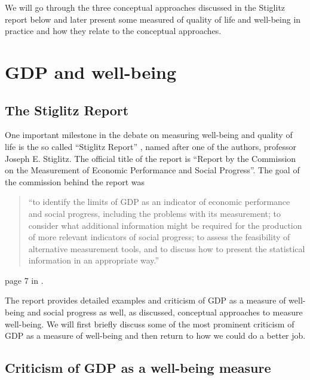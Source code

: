 \documentclass[]{book}
\begin{document}
\citep[page 41 in][]{stiglitz2010report}

We will go through the three conceptual approaches discussed in the Stiglitz report below and later present some measured of quality of life and well-being in practice and how they relate to the conceptual approaches.

\hypertarget{gdp-and-well-being}{%
\section{GDP and well-being}\label{gdp-and-well-being}}

\hypertarget{the-stiglitz-report}{%
\subsection{The Stiglitz Report}\label{the-stiglitz-report}}

One important milestone in the debate on measuring well-being and quality of life is the so called ``Stiglitz Report'' \citep{stiglitz2010report}, named after one of the authors, professor Joseph E. Stiglitz. The official title of the report is ``Report by the Commission on the Measurement of Economic Performance and Social Progress''. The goal of the commission behind the report was

\begin{quote}
``to identify the limits of GDP as an indicator of economic performance and social progress, including the problems with its measurement; to consider what additional information might be required for the production of more
relevant indicators of social progress; to assess the feasibility of alternative measurement
tools, and to discuss how to present the statistical information in an appropriate way.''
\end{quote}

page 7 in \citep{stiglitz2010report}.

The report provides detailed examples and criticism of GDP as a measure of well-being and social progress as well, as discussed, conceptual approaches to measure well-being. We will first briefly discuss some of the most prominent criticism of GDP as a measure of well-being and then return to how we could do a better job.

\hypertarget{criticism-of-gdp-as-a-well-being-measure}{%
\subsection{Criticism of GDP as a well-being measure}\label{criticism-of-gdp-as-a-well-being-measure}}
\end{document}
